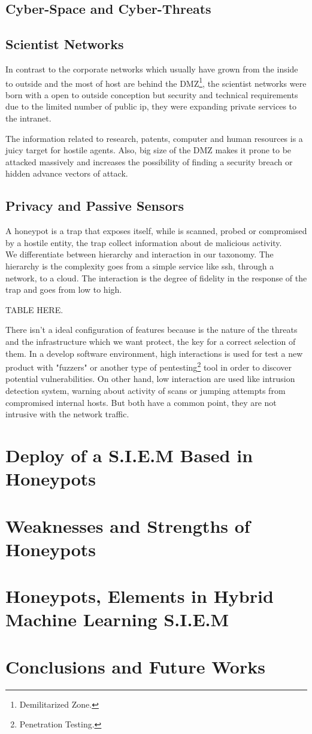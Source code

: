 \documentclass[a4paper]{llncs}
\begin{document}
\subsection{Cyber-Space and Cyber-Threats}
\label{sect:Scientist Networks}

\subsection{Scientist Networks}
\label{sect:Scientist Networks}
In contrast to the corporate networks which usually have grown from the inside to outside and the most of host are behind the DMZ\footnote{Demilitarized Zone.}, the scientist networks were born with a open to outside conception but security and technical requirements due to the limited number of public ip, they were expanding private services to the intranet.

The information related to research, patents, computer and human resources is a juicy target for hostile agents. Also, big size of the DMZ makes it prone to be attacked massively and increases the possibility of finding a security breach or hidden advance vectors of attack.

\subsection{Privacy and Passive Sensors}
\label{sect:Privacy and Passive Sensors}
A honeypot is a trap that exposes itself, while is scanned, probed or compromised by a hostile entity, the trap collect information about de malicious activity.
\\We differentiate between hierarchy and interaction in our taxonomy. The hierarchy is the complexity goes from a simple service like ssh, through a network, to a cloud. The interaction is the degree of fidelity in the response of the trap and goes from low to high. 

TABLE HERE.

There isn't a ideal configuration of features because is the nature of the threats and the infrastructure which we want protect, the key for a correct selection of them. In a develop software environment, high interactions is used for test a new product with "fuzzers" or another type of pentesting\footnote{Penetration Testing.} tool in order to discover potential vulnerabilities. On other hand, low interaction are used like intrusion detection system, warning about activity of scans or jumping attempts from compromised internal hosts. But both have a common point, they are not intrusive with the network traffic.

\section{Deploy of a S.I.E.M Based in Honeypots}

\section{Weaknesses and Strengths of Honeypots}

\section{Honeypots, Elements in Hybrid Machine Learning S.I.E.M}

\section{Conclusions and Future Works}
\end{document}
